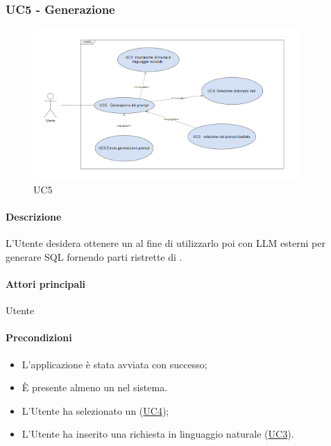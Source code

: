 \subsubsection{UC5 - Generazione }\label{UC5}

\begin{figure}[H]
  \centering
  \includegraphics[width=0.90\textwidth]{assets/uc5.png}
  \caption{UC5}
\end{figure}

\paragraph*{Descrizione}
L’Utente desidera ottenere un  al fine di utilizzarlo poi con LLM esterni per generare  SQL fornendo parti ristrette di .

\paragraph*{Attori principali}
Utente

\paragraph*{Precondizioni}
\begin{itemize}
  \item L'applicazione è stata avviata con successo;
  \item È presente almeno un  nel sistema.
  \item L'Utente ha selezionato un  (\hyperref[UC4]{UC4});
  \item L'Utente ha inserito una richiesta in linguaggio naturale (\hyperref[UC3]{UC3}).
\end{itemize}

